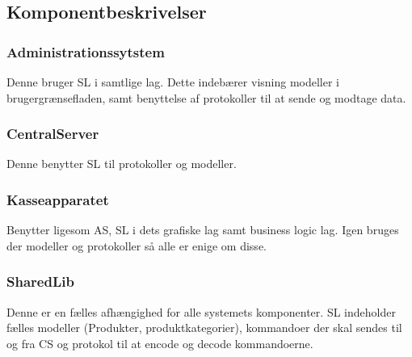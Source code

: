 \subsection{Komponentbeskrivelser}

\subsubsection{Administrationssytstem}
Denne bruger \gls{SL} i samtlige lag. Dette indebærer visning modeller i brugergrænsefladen, samt benyttelse af protokoller til at sende og modtage data.

\subsubsection{CentralServer}
Denne benytter \gls{SL} til protokoller og modeller.

\subsubsection{Kasseapparatet}
Benytter ligesom \gls{AS}, \gls{SL} i dets grafiske lag samt business logic lag. Igen bruges der modeller og protokoller så alle er enige om disse.

\subsubsection{SharedLib}
Denne er en fælles afhængighed for alle systemets komponenter. \gls{SL} indeholder fælles modeller (Produkter, produktkategorier), kommandoer der skal sendes til og fra \gls{CS} og protokol til at encode og decode kommandoerne.
